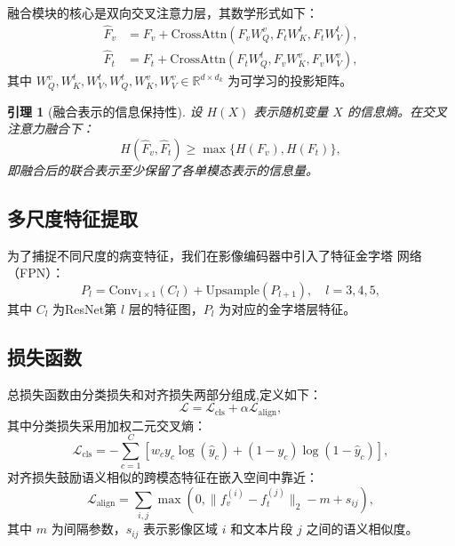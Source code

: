 \documentclass[12pt,a4paper]{article}
\newtheorem{lemma}[theorem]{引理}
\theoremstyle{definition}
\begin{document}
融合模块的核心是双向交叉注意力层，其数学形式如下：
\begin{align}
  \hat{F}_v &= F_v + \text{CrossAttn}(F_v W_Q^v, F_t W_K^t, F_t W_V^t),
    \label{eq:v2t-attn} \\
  \hat{F}_t &= F_t + \text{CrossAttn}(F_t W_Q^t, F_v W_K^v, F_v W_V^v),
    \label{eq:t2v-attn}
\end{align}
其中 $W_Q^v, W_K^t, W_V^t, W_Q^t, W_K^v, W_V^v \in \mathbb{R}^{d \times d_k}$
为可学习的投影矩阵。

\begin{lemma}[融合表示的信息保持性]
设 $H(X)$ 表示随机变量 $X$ 的信息熵。在交叉注意力融合下：
\begin{equation}
  H(\hat{F}_v, \hat{F}_t) \geq \max\{H(F_v), H(F_t)\},
\end{equation}
即融合后的联合表示至少保留了各单模态表示的信息量。
\end{lemma}

\subsection{多尺度特征提取}

为了捕捉不同尺度的病变特征，我们在影像编码器中引入了特征金字塔
网络（FPN）：
\begin{equation}\label{eq:fpn}
  P_l = \text{Conv}_{1\times 1}(C_l) + \text{Upsample}(P_{l+1}),
    \quad l = 3, 4, 5,
\end{equation}
其中 $C_l$ 为ResNet第 $l$ 层的特征图，$P_l$ 为对应的金字塔层特征。

\subsection{损失函数}

总损失函数由分类损失和对齐损失两部分组成,定义如下：
\begin{equation}\label{eq:total-loss}
  \mathcal{L} = \mathcal{L}_{\text{cls}} + \alpha \mathcal{L}_{\text{align}},
\end{equation}
其中分类损失采用加权二元交叉熵：
\begin{equation}\label{eq:cls-loss}
  \mathcal{L}_{\text{cls}} = -\sum_{c=1}^{C} \left[
    w_c y_c \log(\hat{y}_c) + (1-y_c) \log(1-\hat{y}_c)
  \right],
\end{equation}
对齐损失鼓励语义相似的跨模态特征在嵌入空间中靠近：
\begin{equation}\label{eq:align-loss}
  \mathcal{L}_{\text{align}} = \sum_{i,j} \max\left(0,
    \|f_v^{(i)} - f_t^{(j)}\|_2 - m + s_{ij}\right),
\end{equation}
其中 $m$ 为间隔参数，$s_{ij}$ 表示影像区域 $i$ 和文本片段 $j$
之间的语义相似度。
\end{document}
